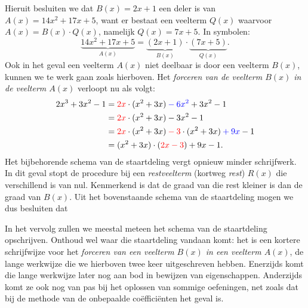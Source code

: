\documentclass{ximera}
\begin{document}
\begin{werkwijze}
  

Hieruit besluiten we dat $B(x) = 2x+1$ een deler is van $A(x) = 14x^2+17x+5$, want er bestaat een veelterm $Q(x)$ waarvoor $A(x) = B(x) \cdot Q(x)$, namelijk $Q(x) = 7x+5$. In symbolen:
\[
\underbrace{14x^2+17x+5}_{A(x)} = \underbrace{(2x+1)}_{B(x)}\cdot\underbrace{(7x + 5)}_{Q(x)}.
\]
Ook in het geval een veelterm $A(x)$ niet deelbaar is door een veelterm $B(x)$, kunnen we te werk gaan zoals hierboven. Het {\em forceren van de veelterm $B(x)$ in de veelterm $A(x)$} verloopt nu als volgt:
\begin{align*}
2x^3 + 3x^2 - 1 
& = \mathcolor{red}{2x} \cdot (x^2+3x) \mathcolor{blue}{- 6x^2} + 3x^2 - 1 \\
& = \mathcolor{red}{2x} \cdot (x^2+3x) - 3x^2 - 1 \\
& = \mathcolor{red}{2x} \cdot (x^2+3x) \mathcolor{red}{- 3} \cdot (x^2+3x) \mathcolor{blue}{+ 9x} - 1  \\
& = (x^2+3x) \cdot (\mathcolor{red}{2x - 3}) + 9x - 1.
\end{align*}
Het bijbehorende schema van de staartdeling vergt opnieuw minder schrijfwerk. 
In dit geval stopt de procedure bij een {\em restveelterm} (kortweg {\em rest}) $R(x)$ die verschillend is van nul. Kenmerkend is dat de graad van die rest kleiner is dan de graad van $B(x)$. Uit het bovenstaande schema van de staartdeling mogen we dus besluiten dat
\end{werkwijze}

In het vervolg zullen we meestal meteen het schema van de staartdeling opschrijven. Onthoud wel waar die staartdeling vandaan komt: het is een kortere schrijfwijze voor het {\em forceren van een veelterm $B(x)$ in een veelterm $A(x)$}, de lange werkwijze die we hierboven twee keer uitgeschreven hebben. Enerzijds komt die lange werkwijze later nog aan bod in bewijzen van eigenschappen. Anderzijds komt ze ook nog van pas bij het oplossen van sommige oefeningen, net zoals dat bij de methode van de onbepaalde co\"effici\"enten het geval is.
\end{document}
